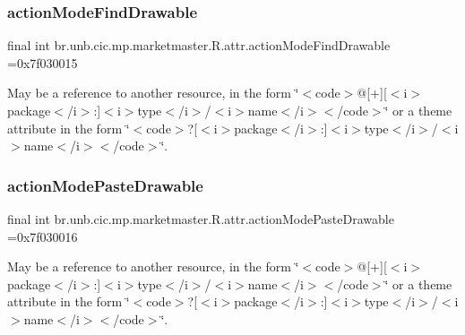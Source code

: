 \subsubsection{\texorpdfstring{action\+Mode\+Find\+Drawable}{actionModeFindDrawable}}
{\footnotesize\ttfamily final int br.\+unb.\+cic.\+mp.\+marketmaster.\+R.\+attr.\+action\+Mode\+Find\+Drawable =0x7f030015\hspace{0.3cm}{\ttfamily [static]}}

May be a reference to another resource, in the form \char`\"{}$<$code$>$@\mbox{[}+\mbox{]}\mbox{[}$<$i$>$package$<$/i$>$\+:\mbox{]}$<$i$>$type$<$/i$>$/$<$i$>$name$<$/i$>$$<$/code$>$\char`\"{} or a theme attribute in the form \char`\"{}$<$code$>$?\mbox{[}$<$i$>$package$<$/i$>$\+:\mbox{]}$<$i$>$type$<$/i$>$/$<$i$>$name$<$/i$>$$<$/code$>$\char`\"{}. \mbox{\label{classbr_1_1unb_1_1cic_1_1mp_1_1marketmaster_1_1R_1_1attr_a0dcd7ede104c179209bc9cdb19ed3357}} 
\subsubsection{\texorpdfstring{action\+Mode\+Paste\+Drawable}{actionModePasteDrawable}}
{\footnotesize\ttfamily final int br.\+unb.\+cic.\+mp.\+marketmaster.\+R.\+attr.\+action\+Mode\+Paste\+Drawable =0x7f030016\hspace{0.3cm}{\ttfamily [static]}}

May be a reference to another resource, in the form \char`\"{}$<$code$>$@\mbox{[}+\mbox{]}\mbox{[}$<$i$>$package$<$/i$>$\+:\mbox{]}$<$i$>$type$<$/i$>$/$<$i$>$name$<$/i$>$$<$/code$>$\char`\"{} or a theme attribute in the form \char`\"{}$<$code$>$?\mbox{[}$<$i$>$package$<$/i$>$\+:\mbox{]}$<$i$>$type$<$/i$>$/$<$i$>$name$<$/i$>$$<$/code$>$\char`\"{}. \mbox{\label{classbr_1_1unb_1_1cic_1_1mp_1_1marketmaster_1_1R_1_1attr_aded8051ba646d22d3890ac3a9e58a65d}} 
